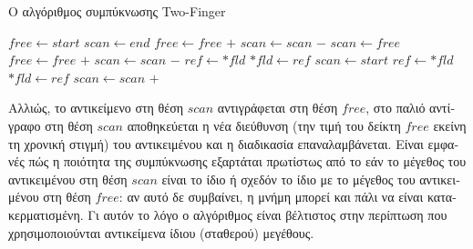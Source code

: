 \begin{greek}
\begin{algorithm}
  \caption{Ο αλγόριθμος συμπύκνωσης Two-Finger}
  \label{alg:mrkcmp_2}
  \begin{algorithmic}[1]
      \State {}
      \State {}
    \EndProcedure
    \Statex
      \State $free \gets start$
      \State $scan \gets end$
          \State {}
          \State $free \gets free$ $+$  
        \EndWhile
          \State $scan \gets scan$ $-$  
        \EndWhile
          \State {}
          \State {}
          \State $scan \gets free$ 
          \State $free \gets free$ $+$ 
          \State $scan \gets scan$ $-$ 
        \EndIf
      \EndWhile
    \EndProcedure
    \Statex
       
        \State $ref \gets *fld$
          \State $*fld \gets ref$ %
        \EndIf
      \EndFor
      \State $scan \gets start$
       
          \State $ref \gets *fld$
            \State $*fld \gets ref$ 
          \EndIf
        \EndFor
        \State $scan \gets scan$ $+$  
      \EndWhile
    \EndProcedure
  \end{algorithmic}
\end{algorithm}

Αλλιώς, το αντικείμενο στη 
θέση $scan$ αντιγράφεται στη θέση $free$, στο παλιό αντίγραφο στη θέση $scan$ αποθηκεύεται 
η νέα διεύθυνση (την τιμή του δείκτη $free$ εκείνη τη χρονική στιγμή) του αντικειμένου και 
η διαδικασία επαναλαμβάνεται. Είναι εμφανές πώς η ποιότητα της συμπύκνωσης εξαρτάται 
πρωτίστως από το εάν το μέγεθος του αντικειμένου στη θέση $scan$ είναι το ίδιο ή σχεδόν το 
ίδιο με το μέγεθος του αντικειμένου στη θέση $free$: αν αυτό δε συμβαίνει, η μνήμη μπορεί 
και πάλι να είναι κατακερματισμένη. Γι αυτόν το λόγο ο αλγόριθμος είναι βέλτιστος στην 
περίπτωση που χρησιμοποιούνται αντικείμενα ίδιου (σταθερού) μεγέθους.


\end{greek}
